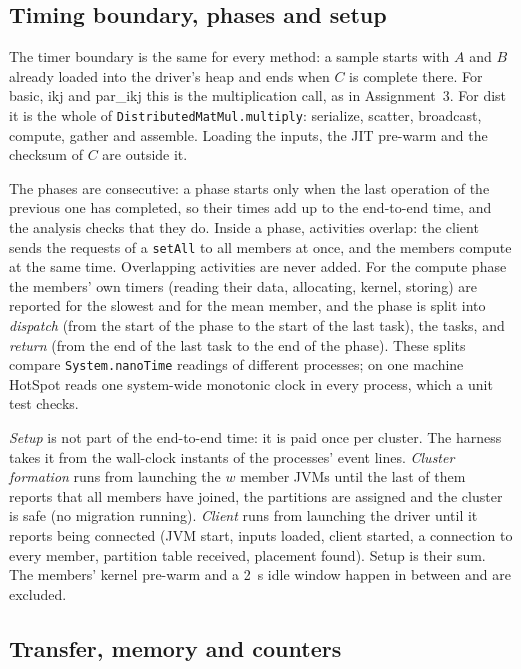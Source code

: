 \documentclass[11pt,a4paper]{article}
\begin{document}
\subsection{Timing boundary, phases and setup}
\label{sec:timing}

The timer boundary is the same for every method: a sample starts with $A$ and
$B$ already loaded into the driver's heap and ends when $C$ is complete there.
For basic, ikj and par\_ikj this is the multiplication call, as in
Assignment~3. For dist it is the whole of \texttt{DistributedMatMul.multiply}:
serialize, scatter, broadcast, compute, gather and assemble. Loading the
inputs, the JIT pre-warm and the checksum of $C$ are outside it.

The phases are consecutive: a phase starts only when the last operation of the
previous one has completed, so their times add up to the end-to-end time, and
the analysis checks that they do. Inside a phase, activities overlap: the
client sends the requests of a \texttt{setAll} to all members at once, and the
members compute at the same time. Overlapping activities are never added. For
the compute phase the members' own timers (reading their data, allocating,
kernel, storing) are reported for the slowest and for the mean member, and the
phase is split into \emph{dispatch} (from the start of the phase to the start of
the last task), the tasks, and \emph{return} (from the end of the last task to
the end of the phase). These splits compare \texttt{System.nanoTime} readings of
different processes; on one machine HotSpot reads one system-wide monotonic
clock in every process, which a unit test checks.

\emph{Setup} is not part of the end-to-end time: it is paid once per cluster.
The harness takes it from the wall-clock instants of the processes' event
lines. \emph{Cluster formation} runs from launching the $w$ member JVMs until the
last of them reports that all members have joined, the partitions are assigned
and the cluster is safe (no migration running). \emph{Client} runs from launching
the driver until it reports being connected (JVM start, inputs loaded, client
started, a connection to every member, partition table received, placement
found). Setup is their sum. The members' kernel pre-warm and a 2~s idle window
happen in between and are excluded.

\subsection{Transfer, memory and counters}
\label{sec:metrics}
\end{document}
